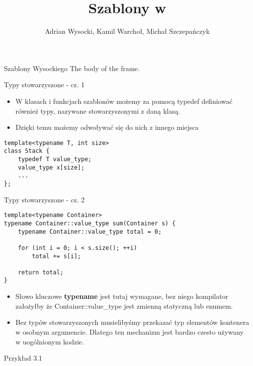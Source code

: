 \documentclass[11pt]{beamer}
\title{Szablony w \cpp}
\author[]{Adrian Wysocki, Kamil Warchoł, Michał Szczepańczyk}
\begin{document}
\begin{frame}
\titlepage
\end{frame}
\author{}
\begin{frame}{Szablony Wysockiego}
The body of the frame.
\end{frame}

\begin{frame}[fragile]{Typy stowarzyszone - cz. 1}
    \begin{itemize}
        \item W klasach i funkcjach szablonów możemy za pomocą typedef definiować również typy, nazywane stowarzyszonymi z daną klasą.
        \item Dzięki temu możemy odwoływać się do nich z innego miejsca
    \end{itemize}
    \begin{lstlisting}[frame=single]
template<typename T, int size>
class Stack {
    typedef T value_type;
    value_type x[size];
    ...
};
    \end{lstlisting}
\end{frame}

\begin{frame}[fragile]{Typy stowarzyszone - cz. 2}
    \begin{lstlisting}[frame=single,basicstyle=\small]
template<typename Container>
typename Container::value_type sum(Container s) {
    typename Container::value_type total = 0;
    
    for (int i = 0; i < s.size(); ++i)
        total += s[i];

    return total;
}
    \end{lstlisting}
    \begin{itemize}
        \item Słowo kluczowe \textbf{typename} jest tutaj wymagane, bez niego kompilator założyłby że Container::value\_type jest zmienną statyczną lub enumem.
        \item Bez typów stowarzyszonych musielibyśmy przekazać typ elementów kontenera w osobnym argumencie. Dlatego ten mechanizm jest bardzo czesto używany w uogólnionym kodzie.
    \end{itemize}
    \alert{Przykład 3.1} 
\end{frame}
\end{document}
